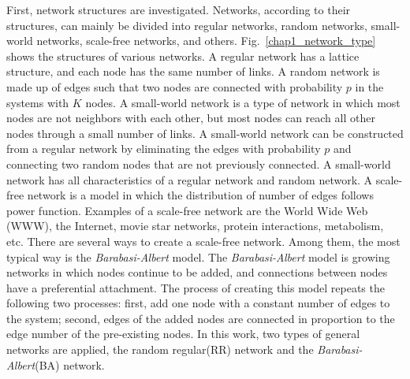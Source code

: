 First, network structures are investigated. Networks, according to their structures, can mainly be divided into regular networks, random networks\parencite{erdos1960}, small-world networks\parencite{watts1998}, scale-free networks\parencite{barabasi2011}, and others. Fig.~\ref{chap1_network_type} shows the structures of various networks. A regular network has a lattice structure, and each node has the same number of links. A random network is made up of edges such that two nodes are connected with probability $p$ in the systems with $K$ nodes. A small-world network is a type of network in which most nodes are not neighbors with each other, but most nodes can reach all other nodes through a small number of links. A small-world network can be constructed from a regular network by eliminating the edges with probability $p$ and connecting two random nodes that are not previously connected. A small-world network has all characteristics of a regular network and random network. A scale-free network is a model in which the distribution of number of edges follows power function. Examples of a scale-free network are the World Wide Web (WWW), the Internet, movie star networks, protein interactions, metabolism, etc. There are several ways to create a scale-free network. Among them, the most typical way is the \textit{Barabasi-Albert} model. The \textit{Barabasi-Albert} model is growing networks in which nodes continue to be added, and connections between nodes have a preferential attachment. The process of creating this model repeats the following two processes: first, add one node with a constant number of edges to the system; second, edges of the added nodes are connected in proportion to the edge number of the pre-existing nodes. In this work, two types of general networks are applied, the random regular(RR) network and the \textit{Barabasi-Albert}(BA) network. 

